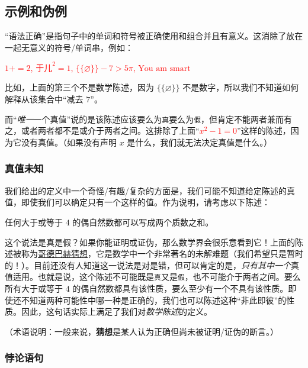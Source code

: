 \subsection{示例和伪例}

``语法正确''是指句子中的单词和符号被正确使用和组合并且有意义。这消除了放在一起无意义的符号/单词串，例如：
\begin{center}
    \textcolor{red}{$1+ = 2$, $\text{于儿}^2 = 1$, $\{\{\varnothing\}\} - 7 > 5\pi$, $\text{You am smart}$}
\end{center}
比如，上面的第三个不是数学陈述，因为 $\{\{\varnothing\}\}$ 不是数字，所以我们不知道如何解释从该集合中``减去 $7$''。

而``\emph{唯一}一个真值''说的是该陈述应该要么为\verb|真|要么为\verb|假|，但肯定不能两者兼而有之，或者两者都不是或介于两者之间。这排除了上面``\textcolor{red}{$x^2 - 1 = 0$}''这样的陈述，因为它没有真值。（如果没有声明 $x$ 是什么，我们就无法决定真值是什么。）

\subsubsection*{真值未知}

我们给出的定义中一个奇怪/有趣/复杂的方面是，我们可能不知道给定陈述的真值，即使我们可以确定只有一个这样的值。作为说明，请考虑以下陈述：
\begin{center}
    \textcolor{olivegreen}{任何大于或等于 $4$ 的偶自然数都可以写成两个质数之和。}
\end{center}

这个说法是真是假？如果你能证明或证伪，那么数学界会很乐意看到它！上面的陈述被称为\href{https://baike.baidu.com/item/哥德巴赫猜想/72364}{哥德巴赫猜想}，它是数学中一个非常著名的未解难题（我们希望只是暂时的！）。目前还没有人知道这一说法是对是错，但可以肯定的是，\emph{只有其中一个}真值适用。也就是说，这个陈述不可能既是\verb|真|又是\verb|假|，也不可能介于两者之间。要么所有大于或等于 $4$ 的偶自然数都具有该性质，要么至少有一个不具有该性质。即使还不知道两种可能性中哪一种是正确的，我们也可以陈述这种``非此即彼''的性质。因此，这句话实际上满足了我们对\emph{数学陈述}的定义。

（术语说明：一般来说，\textbf{猜想}是某人认为正确但尚未被证明/证伪的断言。）

\subsubsection*{悖论语句}

